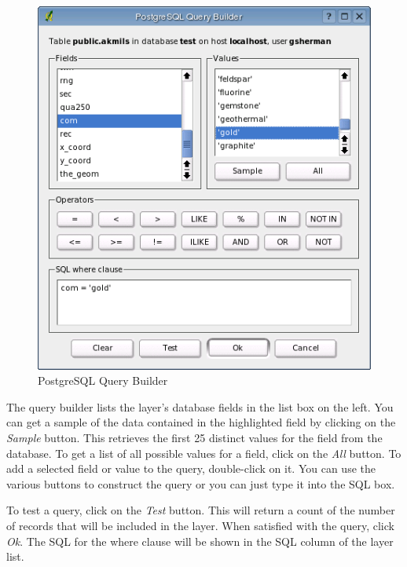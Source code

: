 \documentclass[10pt,english]{article}
\begin{document}
\begin{onehalfspace}
\begin{figure}[h]
  \begin{center}
    \caption{PostgreSQL Query Builder}\label{fig:query_builder}\smallskip
    \includegraphics[scale=.6]{qgis_user_guide_images/querybuilder}
  \end{center}  
\end{figure}

The query builder lists the layer's database
fields in the list box on the left.  You can get a sample of the data contained
in the highlighted field by clicking on the \textit{Sample} button. This
retrieves the first 25 distinct values for the field from the database. To get a
list of all possible values for a field, click on the \textit{All}
button. To
add a selected field or value to the query, double-click on it. You can use the
various buttons to construct the query or you can just type it into the SQL box.

To test a query, click on the \textit{Test} button. This will return a count of
the number of records that will be included in the layer. When satisfied with
the query, click \textit{Ok}. The SQL for the where clause will be shown in the
SQL column of the layer list.



\end{onehalfspace}
\end{document}
